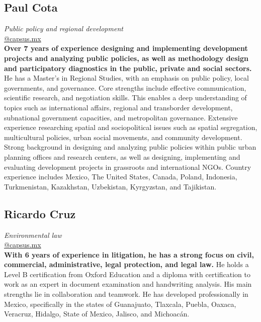 \documentclass[
	a4paper,
	12pt,
	unnumberedsections,
]{CSSullivanBusinessReport}
\begin{document}
\subsection*{Paul Cota}
\textit{Public policy and regional development} \\
\href{mailto:@capsus.mx}{@capsus.mx} \\[0.5em]
\textbf{Over 7 years of experience designing and implementing development projects and analyzing public policies, as well as methodology design and participatory diagnostics in the public, private and social sectors.} He has a Master’s in Regional Studies, with an emphasis on public policy, local governments, and governance. Core strengths include effective communication, scientific research, and negotiation skills. This enables a deep understanding of topics such as international affairs, regional and transborder development, subnational government capacities, and metropolitan governance. Extensive experience researching spatial and sociopolitical issues such as spatial segregation, multicultural policies, urban social movements, and community development. Strong background in designing and analyzing public policies within public urban planning offices and research centers,  as well as designing, implementing and evaluating development projects in grassroots and international NGOs. Country experience includes Mexico, The United States, Canada, Poland, Indonesia, Turkmenistan, Kazakhstan, Uzbekistan, Kyrgyzstan, and Tajikistan.

\subsection*{Ricardo Cruz}
\textit{Environmental law} \\
\href{mailto:@capsus.mx}{@capsus.mx} \\[0.5em]
\textbf{With 6 years of experience in litigation, he has a strong focus on civil, commercial, administrative, legal protection, and legal law.} He holds a Level B certification from Oxford Education and a diploma with certification to work as an expert in document examination and handwriting analysis. His main strengths lie in collaboration and teamwork. He has developed professionally in Mexico, specifically in the states of Guanajuato, Tlaxcala, Puebla, Oaxaca, Veracruz, Hidalgo, State of Mexico, Jalisco, and Michoacán.
\end{document}
